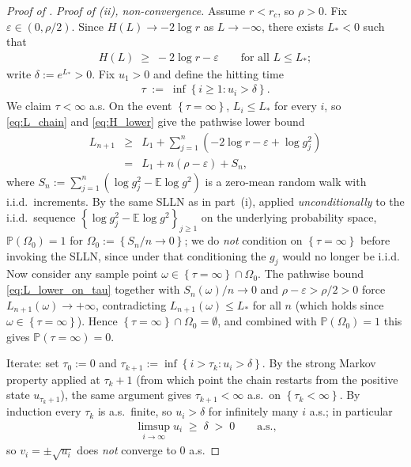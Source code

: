 \documentclass{article}
\newcommand{\Prob}[1]{\mathbb{P}\left( #1 \right)}
\newcommand{\Set}[1]{\left\{ #1 \right\}}
\newcommand{\Brack}[1]{\left( #1 \right)}
\newcommand{\Exp}[1]{\mathbb{E} #1}
\newcommand{\eps}{\varepsilon}
\begin{document}
\begin{proof}[Proof of ]
  \emph{Proof of (ii), non-convergence.} Assume $r < r_c$, so $\rho > 0$. Fix $\eps \in (0, \rho/2)$. Since $H(L) \to -2\log r$ as $L \to -\infty$, there exists $L_* < 0$ such that
  \begin{eqnarray}
    \label{eq:H_lower}
    H(L) \;\ge\; -2\log r - \eps \qquad \text{for all } L \le L_*;
  \end{eqnarray}
  write $\delta := e^{L_*} > 0$. Fix $u_1 > 0$ and define the hitting time
  \begin{eqnarray*}
    \tau \;:=\; \inf\Set{i \ge 1 : u_i > \delta}.
  \end{eqnarray*}
  We claim $\tau < \infty$ a.s. On the event $\Set{\tau = \infty}$, $L_i \le L_*$ for every $i$, so \eqref{eq:L_chain} and \eqref{eq:H_lower} give the pathwise lower bound
  \begin{eqnarray}
    \label{eq:L_lower_on_tau}
    L_{n+1} & \ge & L_1 + \sum_{j=1}^n\Brack{-2\log r - \eps + \log g_j^2} \nonumber \\
    & = & L_1 + n\Brack{\rho - \eps} + S_n,
  \end{eqnarray}
  where $S_n := \sum_{j=1}^n(\log g_j^2 - \Exp{\log g^2})$ is a zero-mean random walk with i.i.d.\ increments. By the same SLLN as in part~(i), applied \emph{unconditionally} to the i.i.d.\ sequence $\Set{\log g_j^2 - \Exp{\log g^2}}_{j \ge 1}$ on the underlying probability space, $\Prob{\Omega_0} = 1$ for $\Omega_0 := \Set{S_n/n \to 0}$; we do \emph{not} condition on $\Set{\tau = \infty}$ before invoking the SLLN, since under that conditioning the $g_j$ would no longer be i.i.d. Now consider any sample point $\omega \in \Set{\tau = \infty} \cap \Omega_0$. The pathwise bound \eqref{eq:L_lower_on_tau} together with $S_n(\omega)/n \to 0$ and $\rho - \eps > \rho/2 > 0$ force $L_{n+1}(\omega) \to +\infty$, contradicting $L_{n+1}(\omega) \le L_*$ for all $n$ (which holds since $\omega \in \Set{\tau = \infty}$). Hence $\Set{\tau = \infty} \cap \Omega_0 = \emptyset$, and combined with $\Prob{\Omega_0} = 1$ this gives $\Prob{\tau = \infty} = 0$.

  Iterate: set $\tau_0 := 0$ and $\tau_{k+1} := \inf\Set{i > \tau_k : u_i > \delta}$. By the strong Markov property applied at $\tau_k + 1$ (from which point the chain restarts from the positive state $u_{\tau_k + 1}$), the same argument gives $\tau_{k+1} < \infty$ a.s.\ on $\Set{\tau_k < \infty}$. By induction every $\tau_k$ is a.s.\ finite, so $u_i > \delta$ for infinitely many $i$ a.s.; in particular
  \begin{eqnarray*}
    \limsup_{i\to\infty} u_i \;\ge\; \delta \;>\; 0 \qquad \text{a.s.,}
  \end{eqnarray*}
  so $v_i = \pm\sqrt{u_i}$ does \emph{not} converge to $0$ a.s.


\end{proof}
\end{document}
